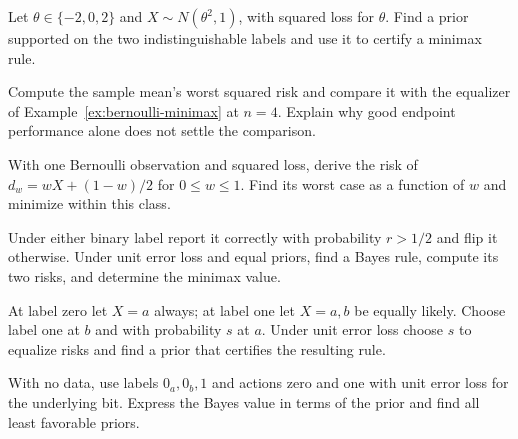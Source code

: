 \documentclass[11pt,oneside]{book}
\theoremstyle{definition}
\theoremstyle{remark}
\begin{document}
\begin{practiceexercise}
\label{wex:equivalent-signs-minimax}
Let $\theta\in\{-2,0,2\}$ and $X\sim N(\theta^2,1)$, with squared loss for
$\theta$. Find a prior supported on the two indistinguishable labels and use
it to certify a minimax rule.
\end{practiceexercise}

\begin{practiceexercise}
\label{wex:mean-versus-bernoulli-equalizer}
Compute the sample mean's worst squared risk and compare it with the
equalizer of Example~\ref{ex:bernoulli-minimax} at $n=4$. Explain why good
endpoint performance alone does not settle the comparison.
\end{practiceexercise}

\begin{practiceexercise}
\label{wex:affine-one-bit-minimax}
With one Bernoulli observation and squared loss, derive the risk of
$d_w=wX+(1-w)/2$ for $0\le w\le1$. Find its worst case as a function of $w$
and minimize within this class.
\end{practiceexercise}

\begin{practiceexercise}
\label{wex:symmetric-bit-minimax}
Under either binary label report it correctly with probability $r>1/2$ and
flip it otherwise. Under unit error loss and equal priors, find a Bayes
rule, compute its two risks, and determine the minimax value.
\end{practiceexercise}

\begin{practiceexercise}
\label{wex:asymmetric-bit-minimax}
At label zero let $X=a$ always; at label one let $X=a,b$ be equally likely.
Choose label one at $b$ and with probability $s$ at $a$. Under unit error
loss choose $s$ to equalize risks and find a prior that certifies the
resulting rule.
\end{practiceexercise}

\begin{practiceexercise}
\label{wex:duplicated-label-least-favorable}
With no data, use labels $0_a,0_b,1$ and actions zero and one with unit
error loss for the underlying bit. Express the Bayes value in terms of the
prior and find all least favorable priors.
\end{practiceexercise}
\end{document}

